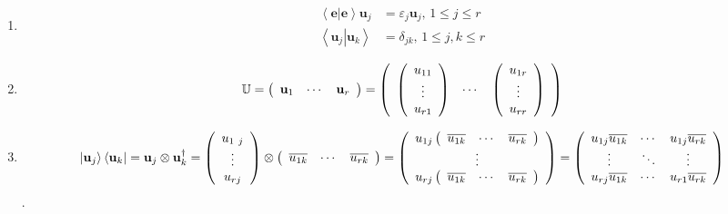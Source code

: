 \documentclass[aps,preprint]{revtex4}%
\begin{document}
\begin{enumerate}
\item
\begin{align}
\left\langle \left.  \mathbf{e}\right\vert \mathbf{e}\right\rangle
\mathbf{u}_{j}  &  =\varepsilon_{j}\mathbf{u}_{j},\,1\leq j\leq r\\
\left\langle \left.  \mathbf{u}_{j}\right\vert \mathbf{u}_{k}\right\rangle  &
=\delta_{jk},\,1\leq j,k\leq r
\end{align}


\item
\begin{equation}
\mathbb{U}=\left(
\begin{array}
[c]{ccc}%
\mathbf{u}_{1} & \cdots & \mathbf{u}_{r}%
\end{array}
\right)  =\left(
\begin{array}
[c]{ccc}%
\left(
\begin{array}
[c]{c}%
u_{11}\\
\vdots\\
u_{r1}%
\end{array}
\right)  & \cdots & \left(
\begin{array}
[c]{c}%
u_{1r}\\
\vdots\\
u_{rr}%
\end{array}
\right)
\end{array}
\right)
\end{equation}


\item
\begin{equation}
\left\vert \mathbf{u}_{j}\right\rangle \left\langle \mathbf{u}_{k}\right\vert
=\mathbf{u}_{j}\otimes\mathbf{u}_{k}^{\dagger}=\left(
\begin{array}
[c]{c}%
u_{1\ j}\\
\vdots\\
u_{rj}%
\end{array}
\right)  \otimes\left(
\begin{array}
[c]{ccc}%
\overline{u_{1k}} & \cdots & \overline{u_{rk}}%
\end{array}
\right)  =\left(
\begin{array}
[c]{c}%
u_{1j}\left(
\begin{array}
[c]{ccc}%
\overline{u_{1k}} & \cdots & \overline{u_{rk}}%
\end{array}
\right) \\
\vdots\\
u_{rj}\left(
\begin{array}
[c]{ccc}%
\overline{u_{1k}} & \cdots & \overline{u_{rk}}%
\end{array}
\right)
\end{array}
\right)  =\left(
\begin{array}
[c]{ccc}%
u_{1j}\overline{u_{1k}} & \cdots & u_{1j}\overline{u_{rk}}\\
\vdots & \ddots & \vdots\\
u_{rj}\overline{u_{1k}} & \cdots & u_{r1}\overline{u_{rk}}%
\end{array}
\right)
\end{equation}
$.$
\end{enumerate}
\end{document}
